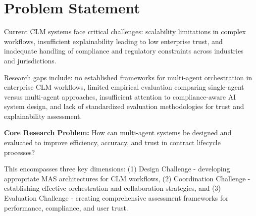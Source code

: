 
\chapter{Problem Statement}\label{chapter:problem_statement}

Current CLM systems face critical challenges: scalability limitations in complex workflows, insufficient explainability leading to low enterprise trust, and inadequate handling of compliance and regulatory constraints across industries and jurisdictions.

Research gaps include: no established frameworks for multi-agent orchestration in enterprise CLM workflows, limited empirical evaluation comparing single-agent versus multi-agent approaches, insufficient attention to compliance-aware AI system design, and lack of standardized evaluation methodologies for trust and explainability assessment.

\textbf{Core Research Problem:} How can multi-agent systems be designed and evaluated to improve efficiency, accuracy, and trust in contract lifecycle processes?

This encompasses three key dimensions: (1) Design Challenge - developing appropriate MAS architectures for CLM workflows, (2) Coordination Challenge - establishing effective orchestration and collaboration strategies, and (3) Evaluation Challenge - creating comprehensive assessment frameworks for performance, compliance, and user trust.
